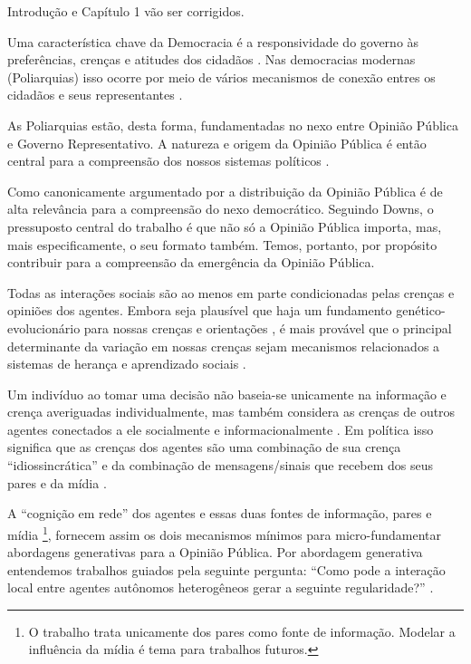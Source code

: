 
\begin{tcolorbox}[{colback=yellow!10!white,
colframe=yellow!75!black}]
Introdução e Capítulo 1 vão ser corrigidos.
\end{tcolorbox}

  


Uma característica chave da Democracia é a responsividade do governo às
preferências, crenças e atitudes dos cidadãos
\cite{dahl1973polyarchy,bartels2003democracy}. Nas democracias modernas
(Poliarquias) isso ocorre por meio de vários mecanismos de conexão entres os
cidadãos e seus representantes \cite{dahl1989democracy,
  schumpeter2013capitalism}.

As Poliarquias estão, desta forma, fundamentadas no nexo entre Opinião Pública e
Governo Representativo. A natureza e origem da Opinião Pública é então
central para a compreensão dos nossos sistemas políticos
\cite{berelson1952democratic}.

Como canonicamente argumentado por  a distribuição
da Opinião Pública é de alta relevância para a compreensão do nexo democrático.
Seguindo Downs, o pressuposto central do trabalho é que não só a Opinião Pública
importa, mas, mais especificamente, o seu formato também. Temos, portanto, por
propósito contribuir para a compreensão da emergência da Opinião
Pública.

Todas as interações sociais são ao menos em parte condicionadas pelas crenças e
opiniões dos agentes. Embora seja plausível que haja um fundamento
genético-evolucionário para nossas crenças e orientações
\cite{fowler2008biology, fowler2013defense}, é mais provável que o principal
determinante da variação em  nossas crenças sejam  mecanismos relacionados a 
sistemas de herança e aprendizado sociais \cite{jablonka2014evolution}.

Um indivíduo ao tomar uma decisão não baseia-se unicamente na informação e
crença averiguadas individualmente, mas também considera as crenças de outros
agentes conectados a ele socialmente e informacionalmente
\cite{gintis2016individuality}. Em política isso significa que as crenças dos
agentes são uma combinação de sua crença ``idiossincrática'' e da combinação de
mensagens/sinais que recebem dos seus pares e da mídia
\cite{barabas2004deliberation,ryan2011social}.

A ``cognição em rede'' \cite{gintis2016individuality} dos agentes e essas duas
fontes de informação, pares e mídia \footnote{O trabalho trata unicamente dos
  pares como fonte de informação. Modelar a influência da mídia é tema para
  trabalhos futuros.}, fornecem assim os dois mecanismos mínimos para
micro-fundamentar abordagens generativas para a Opinião Pública. Por abordagem
generativa entendemos trabalhos guiados pela seguinte pergunta: ``Como pode a
interação local entre agentes autônomos heterogêneos gerar a seguinte
regularidade?'' \cite{epstein2006generative}.

